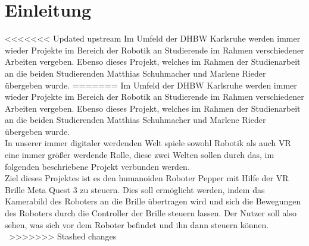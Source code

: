 \chapter{Einleitung}
<<<<<<< Updated upstream
Im Umfeld der \ac{DHBW} Karlsruhe werden immer wieder Projekte im Bereich der Robotik an Studierende im Rahmen verschiedener Arbeiten vergeben. Ebenso dieses Projekt, welches im Rahmen der Studienarbeit an die beiden Studierenden Matthias Schuhmacher und Marlene Rieder übergeben wurde. 
=======
Im Umfeld der \ac{DHBW} Karlsruhe werden immer wieder Projekte im Bereich der Robotik an Studierende im Rahmen verschiedener Arbeiten vergeben. Ebenso dieses Projekt, welches im Rahmen der Studienarbeit an die beiden Studierenden Matthias Schuhmacher und Marlene Rieder übergeben wurde.
\\

\noindent 
In unserer immer digitaler werdenden Welt spiele sowohl Robotik als auch \ac{VR} eine immer größer werdende Rolle, diese zwei Welten sollen durch das, im folgenden beschriebene Projekt verbunden werden.
\\

\noindent
Ziel dieses Projektes ist es den humanoiden Roboter Pepper mit Hilfe der \ac{VR} Brille Meta Quest 3 zu steuern. Dies soll ermöglicht werden, indem das Kamerabild des Roboters an die Brille übertragen wird und sich die Bewegungen des Roboters durch die Controller der Brille steuern lassen. Der Nutzer soll also sehen, was sich vor dem Roboter befindet und ihn dann steuern können.
\\

\
>>>>>>> Stashed changes
